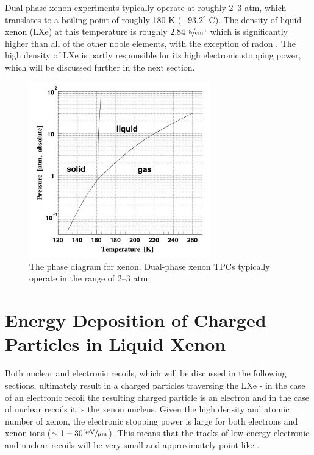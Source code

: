 Dual-phase xenon experiments typically operate at roughly 2--3 atm, which translates to a boiling point of roughly 180 K ($-93.2^{\circ}$ C).  The density of liquid xenon (LXe) at this temperature is roughly 2.84 $\sfrac{\textrm{g}}{\textrm{cm}^3}$ which is significantly higher than all of the other noble elements, with the exception of radon \cite{rankin2009crc}.  The high density of LXe is partly responsible for its high electronic stopping power, which will be discussed further in the next section.

\begin{figure}[t]
	\centering
	\includegraphics[width=0.7\textwidth]{xe_pt_diagram}
	\caption{The phase diagram for xenon.  Dual-phase xenon TPCs typically operate in the range of 2--3 atm.}
	\label{fig:xe_phase_diagram}
\end{figure}



\section{Energy Deposition of Charged Particles in Liquid Xenon}
\label{sec:energy_deposition}

Both nuclear and electronic recoils, which will be discussed in the following sections, ultimately result in a charged particles traversing the LXe - in the case of an electronic recoil the resulting charged particle is an electron and in the case of nuclear recoils it is the xenon nucleus.  Given the high density and atomic number of xenon, the electronic stopping power is large for both electrons and xenon ions ($\sim 1-30 \, \sfrac{\textrm{keV}}{\mu \textrm{m}}$).  This means that the tracks of low energy electronic and nuclear recoils will be very small and approximately point-like \cite{aprile2006simultaneous}.

